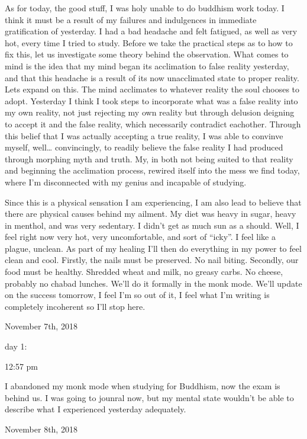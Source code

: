 \qquad As for today, the good stuff, I was holy unable to do buddhism
work today. I think it must be a result of my failures and indulgences
in immediate gratification of yesterday. I had a bad headache and felt
fatigued, as well as very hot, every time I tried to study. Before we
take the practical steps as to how to fix this, let us investigate some
theory behind the observation. What comes to mind is the idea that my
mind began its acclimation to false reality yesterday, and that this
headache is a result of its now unacclimated state to proper reality.
Lets expand on this. The mind acclimates to whatever reality the soul
chooses to adopt. Yesterday I think I took steps to incorporate what was
a false reality into my own reality, not just rejecting my own reality
but through delusion deigning to accept it and the false reality, which
necessarily contradict eachother. Through this belief that I was
actually accepting a true reality, I was able to convinve myself,
well\ldots{} convincingly, to readily believe the false reality I had
produced through morphing myth and truth. My, in both not being suited
to that reality and beginning the acclimation process, rewired itself
into the mess we find today, where I'm disconnected with my genius and
incapable of studying.

\qquad Since this is a physical sensation I am experiencing, I am also
lead to believe that there are physical causes behind my ailment. My
diet was heavy in sugar, heavy in menthol, and was very sedentary. I
didn't get as much sun as a should. Well, I feel right now very hot,
very uncomfortable, and sort of ``icky''. I feel like a plague, unclean.
As part of my healing I'll then do everything in my power to feel clean
and cool. Firstly, the nails must be preserved. No nail biting.
Secondly, our food must be healthy. Shredded wheat and milk, no greasy
carbs. No cheese, probably no chabad lunches. We'll do it formally in
the monk mode. We'll update on the success tomorrow, I feel I'm so out
of it, I feel what I'm writing is completely incoherent so I'll stop
here.

\bigskip
\bigskip
November 7th, 2018

day 1:

12:57 pm

I abandoned my monk mode when studying for Buddhism, now the exam is
behind us. I was going to jounral now, but my mental state wouldn't be
able to describe what I experienced yesterday adequately.

\bigskip
\bigskip
November 8th, 2018

